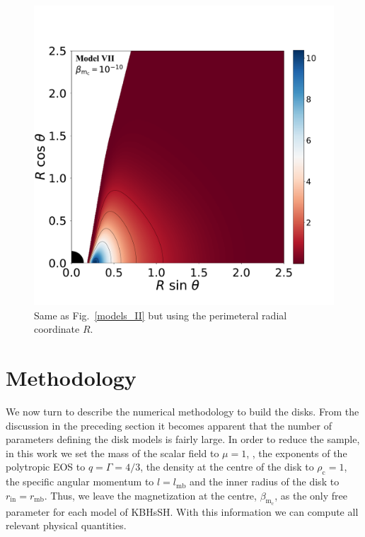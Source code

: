 \documentclass[twocolumn,aps,showpacs,showkeys,prd,superscriptaddress,byrevtex, amsmath]{revtex4-1}
\begin{document}
\begin{figure}
\hspace{-0.2cm}
\includegraphics[scale=0.14]{figures/fig4_VII__10.pdf}
\hspace{-0.2cm}
\caption{Same as Fig.~\ref{models_II} but using the perimeteral radial coordinate $R$.}
\label{models_peri_II}
\end{figure}

\section{Methodology}
\label{procedure}

We now turn to describe the numerical methodology to build the disks. From the discussion in the preceding section it becomes apparent that the number of parameters defining the disk models is fairly large. In order to reduce the sample, in this work we set the mass of the scalar field to $\mu = 1$, , the exponents of the polytropic EOS to $q = \Gamma = 4/3$, the density at the centre of the disk to $\rho_{\mathrm{c}} = 1$, the specific angular momentum to $l = l_{\mathrm{mb}}$ and the inner radius of the disk to $r_{\mathrm{in}} = r_{\mathrm{mb}}$. Thus, we leave the magnetization at the centre, $\beta_{\mathrm{m_c}}$, as the only free parameter for each model of KBHsSH. With this information we can compute all relevant physical quantities.
\end{document}
